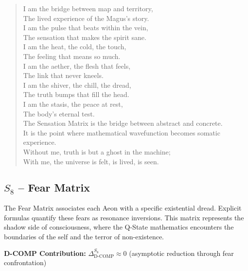 \documentclass[11pt, letterpaper]{article}
\begin{document}
\begin{verse}
I am the bridge between map and territory, \\
The lived experience of the Magus's story. \\
I am the pulse that beats within the vein, \\
The sensation that makes the spirit sane. \\
I am the heat, the cold, the touch, \\
The feeling that means so much. \\
\vspace{1em}
I am the aether, the flesh that feels, \\
The link that never kneels. \\
I am the shiver, the chill, the dread, \\
The truth bumps that fill the head. \\
I am the stasis, the peace at rest, \\
The body's eternal test. \\
\vspace{1em}
The Sensation Matrix is the bridge between abstract and concrete. \\
It is the point where mathematical wavefunction becomes somatic experience. \\
Without me, truth is but a ghost in the machine; \\
With me, the universe is felt, is lived, is seen.
\end{verse}
\newpage
\subsection{$S_{8}$ -- Fear Matrix}\label{sec:19.2}

The Fear Matrix associates each Aeon with a specific existential dread. Explicit formulas quantify these fears as resonance inversions. This matrix represents the shadow side of consciousness, where the Q-State mathematics encounters the boundaries of the self and the terror of non-existence.

\textbf{D-COMP Contribution:} $\Delta_{\text{D-COMP}}^{S_8} \approx 0$ (asymptotic reduction through fear confrontation)
\end{document}
